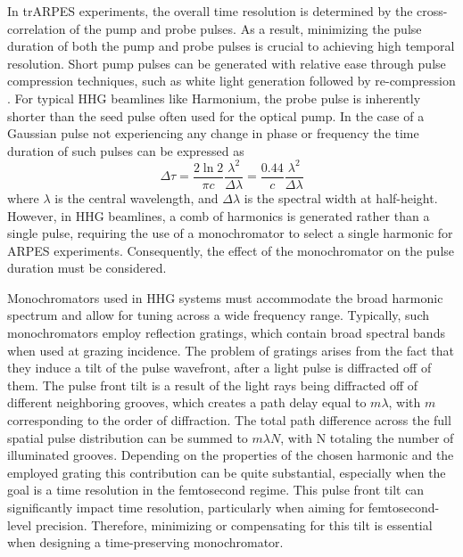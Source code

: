 In trARPES experiments, the overall time resolution is determined by the cross-correlation of the pump and probe pulses.
As a result, minimizing the pulse duration of both the pump and probe pulses is crucial to achieving high temporal resolution.
Short pump pulses can be generated with relative ease through pulse compression techniques, such as white light generation followed by re-compression \cite{nisoli_compression_1997}. For typical HHG beamlines like Harmonium, the probe pulse is inherently shorter than the seed pulse often used for the optical pump.
In the case of a Gaussian pulse not experiencing any change in phase or frequency the time duration of such pulses can be expressed as
\begin{equation}
	\Delta\tau = \frac{2 \ln{2}}{\pi c}\frac{\lambda^2}{\Delta\lambda} = \frac{0.44}{c}\frac{\lambda^2}{\Delta\lambda}
\end{equation}
where $\lambda$ is the central wavelength, and $\Delta\lambda$ is the spectral width at half-height.
However, in HHG beamlines, a comb of harmonics is generated rather than a single pulse, requiring the use of a monochromator to select a single harmonic for ARPES experiments. Consequently, the effect of the monochromator on the pulse duration must be considered.

Monochromators used in HHG systems must accommodate the broad harmonic spectrum and allow for tuning across a wide frequency range.
Typically, such monochromators employ reflection gratings, which contain broad spectral bands when used at grazing incidence.
The problem of gratings arises from the fact that they induce a tilt of the pulse wavefront, after a light pulse is diffracted off of them.
The pulse front tilt is a result of the light rays being diffracted off of different neighboring grooves, which creates a path delay equal to $m\lambda$, with $m$ corresponding to the order of diffraction.
The total path difference across the full spatial pulse distribution can be summed to $m\lambda N$, with N totaling the number of illuminated grooves.
Depending on the properties of the chosen harmonic and the employed grating this contribution can be quite substantial, especially when the goal is a time resolution in the femtosecond regime.
This pulse front tilt can significantly impact time resolution, particularly when aiming for femtosecond-level precision.
Therefore, minimizing or compensating for this tilt is essential when designing a time-preserving monochromator.

